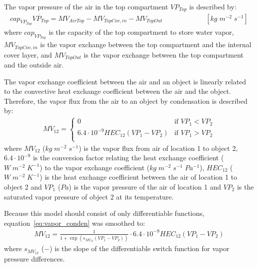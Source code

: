\documentclass[a4paper]{article}
\begin{document}
The vapor pressure of the air in the top compartment \(VP_{Top}\) is described by:
\begin{multline*}
  cap_{VP_{Top}}\dot{VP_{Top}} = MV_{AirTop} - MV_{TopCov,in} - MV_{TopOut} ~~~~~~~~~~~~~~~~~~~~~~~~~~~~ [kg\;m^{-2}\;s^{-1}]
\end{multline*}
where \(cap_{VP_{Top}}\) is the capacity of the top compartment to store water vapor, \(MV_{TopCov,in}\) is the vapor exchange between the top compartment and the internal cover layer, and \(MV_{TopOut}\) is the vapor exchange between the top compartment and the outside air.

The vapor exchange coefficient between the air and an object is linearly related to the convective heat exchange coefficient between the air and the object.
Therefore, the vapor flux from the air to an object by condensation is described by:
\begin{align}
  \label{eq:vapor_conden}
  MV_{12} = \begin{cases}
    0                                       & \text{if~} VP_1 < VP_2 \\
    6.4 \cdot 10^{-9} HEC_{12}(VP_1 - VP_2) & \text{if~} VP_1 > VP_2 \\
  \end{cases}
\end{align}
where \(MV_{12}\) (\(kg\;m^{-2}\;s^{-1}\)) is the vapor flux from air of location 1 to object 2, \(6.4 \cdot 10^{-9}\) is the conversion factor relating the heat exchange coefficient (\(W\;m^{-2}\;K^{-1}\)) to the vapor exchange coefficient (\(kg\;m^{-2}\;s^{-1}\;Pa^{-1}\)), \(HEC_{12}\) (\(W\;m^{-2}\;K^{-1}\)) is the heat exchange coefficient between the air of location 1 to object 2 and \(VP_1\) (\(Pa\)) is the vapor pressure of the air of location 1 and \(VP_2\) is the saturated vapor pressure of object 2 at its temperature.

Because this model should consist of only differentiable functions, equation~\eqref{eq:vapor_conden} was smoothed to:
\begin{align}
  MV_{12} = \frac{1}{1 + \exp \left(s_{MV_{12}} (VP_1 - VP_2)\right)} \cdot 6.4 \cdot 10^{-9} HEC_{12} (VP_1 - VP_2)
\end{align}
where \(s_{MV_{12}}\) (\(-\)) is the slope of the differentiable switch function for vapor pressure differences.
\end{document}
